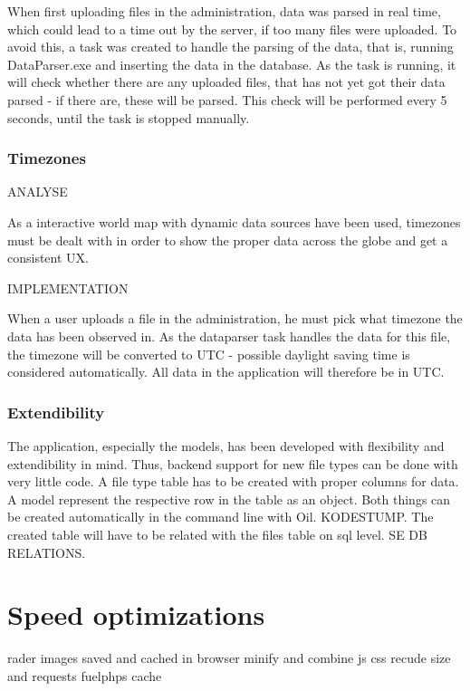 When first uploading files in the administration, data was parsed in real time, which could lead to a time out by the server, if too many files were uploaded. To avoid this, a task was created to handle the parsing of the data, that is, running DataParser.exe and inserting the data in the database. As the task is running, it will check whether there are any uploaded files, that has not yet got their data parsed - if there are, these will be parsed. This check will be performed every 5 seconds, until the task is stopped manually.

\subsubsection{Timezones}

ANALYSE

As a interactive world map with dynamic data sources have been used, timezones must be dealt with in order to show the proper data across the globe and get a consistent UX.

IMPLEMENTATION

When a user uploads a file in the administration, he must pick what timezone the data has been observed in. As the dataparser task handles the data for this file, the timezone will be converted to UTC - possible daylight saving time is considered automatically. All data in the application will therefore be in UTC.

\subsubsection{Extendibility}

The application, especially the models, has been developed with flexibility and extendibility in mind. Thus, backend support for new file types can be done with very little code. A file type table has to be created with proper columns for data. A \textsf{model} represent the respective row in the table as an object. Both things can be created automatically in the command line with Oil. KODESTUMP. The created table will have to be related with the \textsf{files} table on sql level. SE DB RELATIONS. 

\section{Speed optimizations}

rader images saved and cached in browser
minify and combine js css recude size and requests
fuelphps cache

